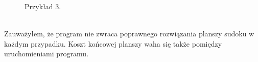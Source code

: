 \documentclass{article}
\begin{document}
        \begin{figure}[h!]
            \centering
            \caption{Przykład 3.}
        \end{figure}\\
        
        
        \FloatBarrier 
        Zauważyłem, że program nie zwraca poprawnego rozwiązania planszy sudoku w każdym przypadku. Koszt końcowej planszy waha się także pomiędzy uruchomieniami programu. 
\end{document}
